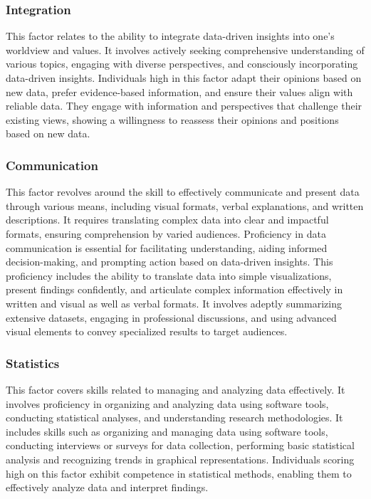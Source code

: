\documentclass[
  12pt,
  a4paper,
  twoside]{article}
\begin{document}
\subsubsection{Integration}\label{integration}

This factor relates to the ability to integrate data-driven insights into one's worldview and values. It involves actively seeking comprehensive understanding of various topics, engaging with diverse perspectives, and consciously incorporating data-driven insights. Individuals high in this factor adapt their opinions based on new data, prefer evidence-based information, and ensure their values align with reliable data. They engage with information and perspectives that challenge their existing views, showing a willingness to reassess their opinions and positions based on new data.

\subsubsection{Communication}\label{communication}

This factor revolves around the skill to effectively communicate and present data through various means, including visual formats, verbal explanations, and written descriptions.
It requires translating complex data into clear and impactful formats, ensuring comprehension by varied audiences. Proficiency in data communication is essential for facilitating understanding, aiding informed decision-making, and prompting action based on data-driven insights. This proficiency includes the ability to translate data into simple visualizations, present findings confidently, and articulate complex information effectively in written and visual as well as verbal formats. It involves adeptly summarizing extensive datasets, engaging in professional discussions, and using advanced visual elements to convey specialized results to target audiences.

\subsubsection{Statistics}\label{statistics}

This factor covers skills related to managing and analyzing data effectively. It involves proficiency in organizing and analyzing data using software tools, conducting statistical analyses, and understanding research methodologies.
It includes skills such as organizing and managing data using software tools, conducting interviews or surveys for data collection, performing basic statistical analysis and recognizing trends in graphical representations. Individuals scoring high on this factor exhibit competence in statistical methods, enabling them to effectively analyze data and interpret findings.
\end{document}
